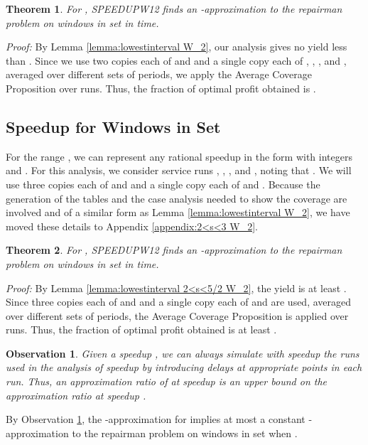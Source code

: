 \documentclass[11pt]{article}
\newtheorem{theorem}{Theorem}[section]
\newtheorem{observation}{Observation}[section]
\newcommand\QED{\ifhmode\allowbreak\else\nobreak\fi
\quad\nobreak\medbreak}
\newcommand{\proofstart}{\par\noindent \emph{Proof:} }
\newcommand{\proofend}{\QED\par}
\newenvironment{proof}{\proofstart}{\proofend}
\begin{document}
\begin{theorem}
For , SPEEDUPW12 finds an -approximation to the repairman problem on windows in set  in  time.
\end{theorem}

\begin{proof}
By Lemma \ref{lemma:lowestinterval W_2}, our analysis gives no yield less than .  Since we use two copies each of  and  and a single copy each of , , , and , averaged over  different sets of periods, we apply the Average Coverage Proposition over  runs.  Thus, the fraction of optimal profit obtained is .
\end{proof}

\subsection{Speedup  for Windows in Set }

For the range , we can represent any rational speedup  in the form  with integers  and .  For this analysis, we consider service runs , , , and , noting that .  We will use three copies each of  and  and a single copy each of  and .  Because the generation of the tables and the case analysis needed to show the coverage are involved and of a similar form as Lemma \ref{lemma:lowestinterval W_2}, we have moved these details to Appendix \ref{appendix:2<s<3 W_2}.

\begin{theorem}
For , SPEEDUPW12 finds an -approximation to the repairman problem on windows in set  in  time.
\end{theorem}

\begin{proof}
By Lemma \ref{lemma:lowestinterval 2<s<5/2 W_2}, the yield is at least .  Since three copies each of  and  and a single copy each of  and  are used, averaged over  different sets of periods, the Average Coverage Proposition is applied over  runs.  Thus, the fraction of optimal profit obtained is at least .
\end{proof}

\begin{observation}
\label{observation:speedup}
Given a speedup , we can always simulate with speedup  the runs used in the analysis of speedup  by introducing delays at appropriate points in each run.  Thus, an approximation ratio of  at speedup  is an upper bound on the approximation ratio at speedup .
\end{observation}

By Observation \ref{observation:speedup}, the -approximation for  implies at most a constant -approximation to the repairman problem on windows in set  when .
\end{document}
